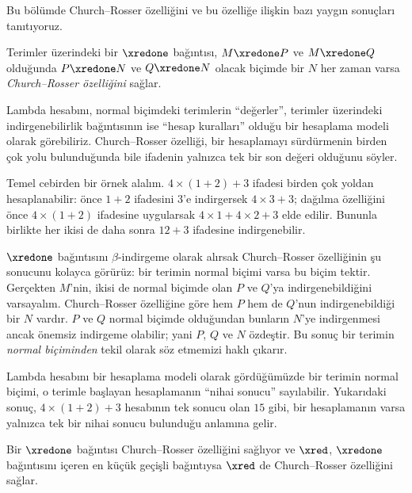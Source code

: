 \documentclass[../../../include/open-logic-section]{subfiles}
\begin{document}


Bu bölümde Church--Rosser özelliğini ve bu özelliğe ilişkin bazı yaygın
sonuçları tanıtıyoruz.

\begin{defn} Terimler üzerindeki bir
  $\xredone$ bağıntısı, $M\xredone P$ ve $M\xredone Q$ olduğunda
  $P\xredone N$ ve $Q\xredone N$ olacak biçimde bir $N$ her zaman varsa
  \emph{Church--Rosser özelliğini} sağlar.
\end{defn}

Lambda hesabını, normal biçimdeki terimlerin ``değerler'', terimler
üzerindeki indirgenebilirlik bağıntısının ise ``hesap kuralları'' olduğu bir
hesaplama modeli olarak görebiliriz. Church--Rosser özelliği, bir hesaplamayı
sürdürmenin birden çok yolu bulunduğunda bile ifadenin yalnızca tek bir son
değeri olduğunu söyler.

Temel cebirden bir örnek alalım. $4\times(1+2)+3$ ifadesi birden çok yoldan
hesaplanabilir: önce $1+2$ ifadesini $3$'e indirgersek $4\times3+3$;
dağılma özelliğini önce $4\times(1+2)$ ifadesine uygularsak
$4\times1+4\times2+3$ elde edilir. Bununla birlikte her ikisi de daha sonra
$12+3$ ifadesine indirgenebilir.

$\xredone$ bağıntısını $\beta$-indirgeme olarak alırsak Church--Rosser
özelliğinin şu sonucunu kolayca görürüz: bir terimin normal biçimi varsa bu
biçim tektir. Gerçekten $M$'nin, ikisi de normal biçimde olan $P$ ve $Q$'ya
indirgenebildiğini varsayalım. Church--Rosser özelliğine göre hem $P$ hem de
$Q$'nun indirgenebildiği bir $N$ vardır. $P$ ve $Q$ normal biçimde olduğundan
bunların $N$'ye indirgenmesi ancak önemsiz indirgeme olabilir; yani $P$, $Q$
ve $N$ özdeştir. Bu sonuç bir terimin \emph{normal biçiminden} tekil olarak
söz etmemizi haklı çıkarır.

Lambda hesabını bir hesaplama modeli olarak gördüğümüzde bir terimin normal
biçimi, o terimle başlayan hesaplamanın ``nihai sonucu'' sayılabilir.
Yukarıdaki sonuç, $4\times(1+2)+3$ hesabının tek sonucu olan $15$ gibi, bir
hesaplamanın varsa yalnızca tek bir nihai sonucu bulunduğu anlamına gelir.

\begin{thm} 
  Bir $\xredone$ bağıntısı Church--Rosser özelliğini sağlıyor ve $\xred$,
  $\xredone$ bağıntısını içeren en küçük geçişli bağıntıysa $\xred$ de
  Church--Rosser özelliğini sağlar.
\end{thm}
\end{document}
